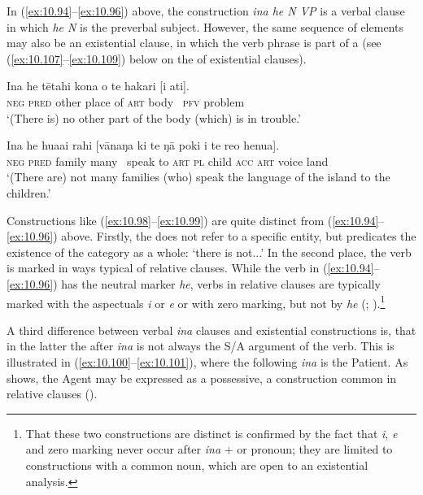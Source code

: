In (\ref{ex:10.94}–\ref{ex:10.96}) above, the construction \textit{{\ꞌ}ina he N VP} is a verbal clause in which \textit{he N} is the preverbal subject. However, the same sequence of elements may also be an existential clause, in which the verb phrase is part of a  (see (\ref{ex:10.107}–\ref{ex:10.109}) below on the  of existential clauses). 

\ea\label{ex:10.98}
\gll {\ꞌ}Ina he tētahi kona o te hakari [i {\ꞌ}ati]. \\
\textsc{neg} \textsc{pred} other place of \textsc{art} body ~\textsc{pfv} problem \\

\glt 
‘(There is) no other part of the body (which) is in trouble.’ \textstyleExampleref{[R481.091]} 
\z

\ea\label{ex:10.99}
\gll {\ꞌ}Ina he hua{\ꞌ}ai rahi [vānaŋa ki te ŋā poki i te re{\ꞌ}o henua].\\
\textsc{neg} \textsc{pred} family many ~speak to \textsc{art} \textsc{pl} child \textsc{acc} \textsc{art} voice land\\

\glt
‘(There are) not many families (who) speak the language of the island to the children.’ \textstyleExampleref{[R533.006]} 
\z

Constructions like (\ref{ex:10.98}–\ref{ex:10.99}) are quite distinct from (\ref{ex:10.94}–\ref{ex:10.96}) above. Firstly, the  does not refer to a specific entity, but predicates the existence of the category as a whole: ‘there is not...’ In the second place, the verb is marked in ways typical of relative clauses. While the verb in (\ref{ex:10.94}–\ref{ex:10.96}) has the neutral marker \textit{he}, verbs in relative clauses are typically marked with the aspectuals \textit{i} or \textit{e} or with zero marking, but not by \textit{he} (; ).\footnote{\label{fn:492}That these two constructions are distinct is confirmed by the fact that \textit{i}, \textit{e} and zero marking never occur after \textit{{\ꞌ}ina} +  or pronoun; they are limited to constructions with a common noun, which are open to an existential analysis.}

A third difference between verbal \textit{{\ꞌ}ina} clauses and existential constructions is, that in the latter the  after \textit{{\ꞌ}ina} is not always the S/A argument of the verb. This is illustrated in (\ref{ex:10.100}–\ref{ex:10.101}), where the  following \textit{{\ꞌ}ina} is the Patient. As  shows, the Agent may be expressed as a possessive, a construction common in relative clauses ().

